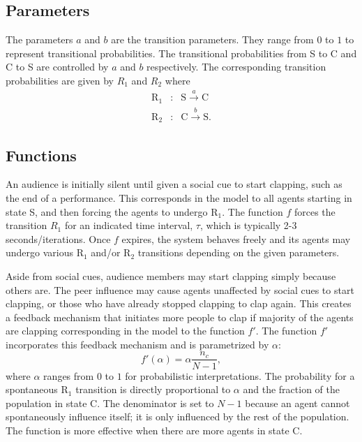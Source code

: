 \subsection{Parameters}
\hspace{\parindent}The parameters $a$ and $b$ are the transition parameters.
They range from $0$ to $1$ to represent transitional probabilities.
The transitional probabilities from S to C and C to S are controlled by $a$ and $b$ respectively.
The corresponding transition probabilities are given by ${R}_{1}$ and ${R}_{2}$ where
\begin{eqnarray}
\mathrm{R}_{1} &:& \mathrm{S} \overset{a}{\longrightarrow} \mathrm{C} \label{eq:r1} \\
\mathrm{R}_{2} &:& \mathrm{C} \overset{b}{\longrightarrow} \mathrm{S}.\label{eq:r2}
\end{eqnarray}


\subsection{Functions}
\hspace{\parindent}An audience is initially silent until given a social cue to start clapping, such as the end of a performance. 
This corresponds in the model to all agents starting in state S, and then forcing the agents to undergo $\mathrm{R}_{1}$.
The function $f$ forces the transition ${R}_{1}$ for an indicated time interval, $\tau$, which is typically 2-3 seconds/iterations.
Once $f$ expires, the system behaves freely and its agents may undergo various $\mathrm{R}_{1}$ and/or $\mathrm{R}_{2}$ transitions depending on the given parameters.


Aside from social cues, audience members may start clapping simply because others are.
The peer influence may cause agents unaffected by social cues to start clapping, or those who have already stopped clapping to clap again.
This creates a feedback mechanism that initiates more people to clap if majority of the agents are clapping corresponding in the model to the function $f'$.
The function $f'$ incorporates this feedback mechanism and is parametrized by $\alpha$:
\begin{equation}\label{eq:f'}
  f'(\alpha) = \alpha \frac{n_c}{N-1},
\end{equation}
where $\alpha$ ranges from $0$ to $1$ for probabilistic interpretations.
The probability for a spontaneous $\mathrm{R}_{1}$ transition is directly proportional to $\alpha$ and the fraction of the population in state C. 
The denominator is set to $N-1$ because an agent cannot spontaneously influence itself; it is only influenced by the rest of the population.
The function is more effective when there are more agents in state C.

